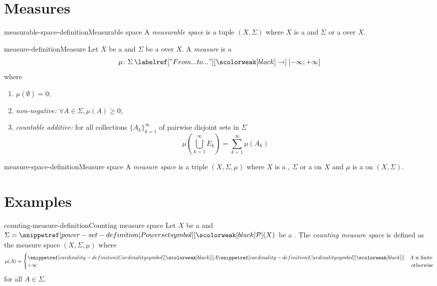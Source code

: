\documentclass[preview]{standalone}
\begin{document}
\genpage

\section{Measures}

\begin{snippetdefinition}{measurable-space-definition}{Measurable space}
    A \textit{measurable space} is a tuple \((X, \Sigma)\)
    where \(X\) is a \set and \(\Sigma\) or a \sigmaalgebra over \(X\).
\end{snippetdefinition}

\begin{snippetdefinition}{measure-definition}{Measure}
    Let \(X\) be a \set and \(\Sigma\) be a \sigmaalgebra over \(X\).
    A \textit{measure} is a \function
    \[
        \mu\colon \Sigma \fromto [-\infty; + \infty]
    \]
    where
    \begin{enumerate}
        \item \(\mu(\emptyset) = 0\);
        \item \emph{non-negative:} \(\forall A \in \Sigma, \mu(A) \geq 0\);
        \item \emph{countable additive:} for all \countable collections \({\{A_k\}}_{k=1}^\infty\)
        of pairwise disjoint sets in \(\Sigma\)
        \[
            \mu\left( \bigcup_{k=1}^\infty E_k \right)
            =
            \sum_{k=1}^\infty \mu(A_k)
        \]
    \end{enumerate}
\end{snippetdefinition}

\begin{snippetdefinition}{measure-space-definition}{Measure space}
    A \textit{measure space} is a triple \((X, \Sigma, \mu)\)
    where \(X\) is a \set, \(\Sigma\) or a \sigmaalgebra on \(X\)
    and \(\mu\) is a \measure on \((X, \Sigma)\).
\end{snippetdefinition}

\section{Examples}

\begin{snippetdefinition}{counting-measure-definition}{Counting measure space}
    Let \(X\) be a \set and \(\Sigma = \powerset(X)\) be a \sigmaalgebra.
    The \textit{counting measure space}
    is defined as the measure space \((X, \Sigma, \mu)\)
    where
    \[
        \mu(A) = \begin{cases}
            \cardinality{A} & A \text{ is finite} \\
            +\infty & \text{ otherwise}
        \end{cases}
    \]
    for all \(A \in \Sigma\).
\end{snippetdefinition}

\end{document}
